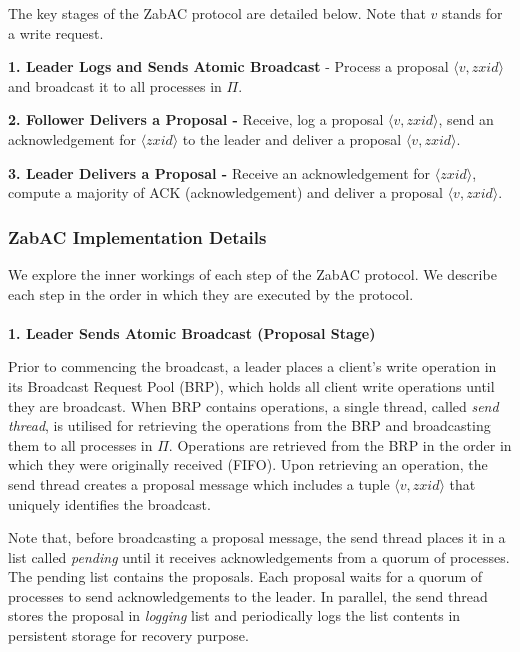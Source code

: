 \documentclass[a4paper,UKenglish]{oasics-v2016}
\begin{document}
The key stages of  the ZabAC protocol  are detailed below. Note that $v$ stands for a write request. 
\begin{description}
	\item \textbf{\textbf{\footnotesize 1. Leader Logs and Sends Atomic Broadcast }}- Process a proposal $\langle v,zxid\rangle$ and broadcast it to all processes in $\Pi$.
	\item \textbf{\footnotesize 2. Follower Delivers a Proposal - }Receive, log a
	proposal $\langle v,zxid\rangle$, send an acknowledgement for $\langle zxid\rangle$ to the leader and deliver a proposal $\langle v,zxid\rangle$.
	\item \textbf{\footnotesize 3. Leader Delivers a Proposal - }Receive an acknowledgement
	for $\langle zxid\rangle$, compute a majority of ACK (acknowledgement) and deliver a
	proposal $\langle v,zxid\rangle$.
\end{description}


\subsubsection{ZabAC Implementation Details}

We explore the inner workings of each step of the
ZabAC protocol. We describe each step in the order in which they are
executed by the protocol.\\\\
\noindent \textbf{\small 1. Leader Sends Atomic Broadcast (Proposal Stage)} 


\noindent Prior to commencing the broadcast, a leader places a client's write
operation in its Broadcast Request Pool (BRP), which holds all client
write operations until they are broadcast. When BRP contains operations, a single thread, called \emph{send thread}, is utilised for retrieving
the operations from the BRP and broadcasting them to all processes in $\Pi$.
Operations are retrieved from the BRP in the order in which they were
originally received (FIFO). Upon retrieving an operation, the send
thread creates a proposal message which includes a
tuple $\langle v,zxid\rangle$ that uniquely identifies the broadcast.


Note that, before broadcasting a proposal message, the send thread places
it in a list called \emph{pending} until it receives acknowledgements from a quorum of processes. The pending list contains the proposals. Each proposal waits for a quorum of processes to send acknowledgements to the leader. In parallel, the send thread stores the proposal in \emph{logging} list and periodically logs the list contents in persistent storage for recovery purpose.\\
\end{document}
